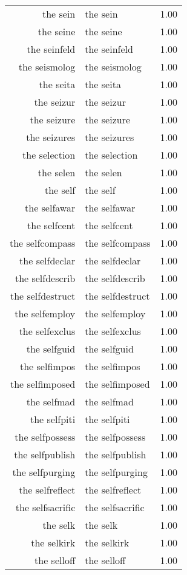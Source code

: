 \begin{table}[ht]
\begin{tabular}{rlr}
  the sein & the sein & 1.00 \\ 
  the seine & the seine & 1.00 \\ 
  the seinfeld & the seinfeld & 1.00 \\ 
  the seismolog & the seismolog & 1.00 \\ 
  the seita & the seita & 1.00 \\ 
  the seizur & the seizur & 1.00 \\ 
  the seizure & the seizure & 1.00 \\ 
  the seizures & the seizures & 1.00 \\ 
  the selection & the selection & 1.00 \\ 
  the selen & the selen & 1.00 \\ 
  the self & the self & 1.00 \\ 
  the selfawar & the selfawar & 1.00 \\ 
  the selfcent & the selfcent & 1.00 \\ 
  the selfcompass & the selfcompass & 1.00 \\ 
  the selfdeclar & the selfdeclar & 1.00 \\ 
  the selfdescrib & the selfdescrib & 1.00 \\ 
  the selfdestruct & the selfdestruct & 1.00 \\ 
  the selfemploy & the selfemploy & 1.00 \\ 
  the selfexclus & the selfexclus & 1.00 \\ 
  the selfguid & the selfguid & 1.00 \\ 
  the selfimpos & the selfimpos & 1.00 \\ 
  the selfimposed & the selfimposed & 1.00 \\ 
  the selfmad & the selfmad & 1.00 \\ 
  the selfpiti & the selfpiti & 1.00 \\ 
  the selfpossess & the selfpossess & 1.00 \\ 
  the selfpublish & the selfpublish & 1.00 \\ 
  the selfpurging & the selfpurging & 1.00 \\ 
  the selfreflect & the selfreflect & 1.00 \\ 
  the selfsacrific & the selfsacrific & 1.00 \\ 
  the selk & the selk & 1.00 \\ 
  the selkirk & the selkirk & 1.00 \\ 
  the selloff & the selloff & 1.00 \\ 

\end{tabular}
\end{table}
